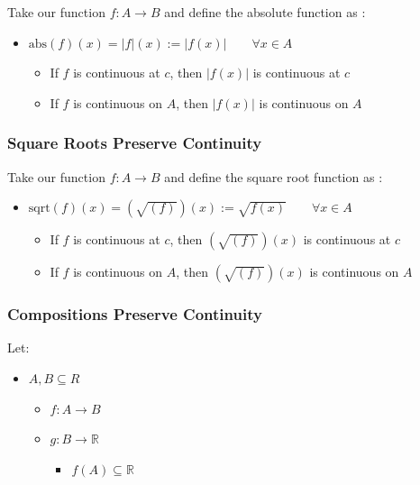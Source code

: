 \documentclass[class=article, crop=false]{standalone}
\begin{document}
Take our function \(f: A \rightarrow B\) and define the absolute
function as :

\begin{itemize}
\item
  \(\text{abs}(f)(x) = \left| f \right|(x) := \left| f(x) \right| \qquad\forall x \in A\)

  \begin{itemize}
  \item
    If \(f\) is continuous at \(c\), then \(\left| f(x) \right|\) is
    continuous at \(c\) 
  \item
    If \(f\) is continuous on \(A\), then \(\left| f(x) \right|\) is
    continuous on \(A\) 
  \end{itemize}
\end{itemize}

\hypertarget{header-n3954}{%
\subsubsection{Square Roots Preserve Continuity}\label{header-n3954}}

Take our function \(f: A \rightarrow B\) and define the square root
function as :

\begin{itemize}
\item
  \(\text{sqrt}(f)(x) = \left(\sqrt{(f)}\right) \left(x\right) := \sqrt{f(x)} \qquad\forall x \in A\)

  \begin{itemize}
  \item
    If \(f\) is continuous at \(c\), then
    \( \left(\sqrt{(f)}\right) \left(x\right)\) is continuous at \(c\) 
  \item
    If \(f\) is continuous on \(A\), then
    \( \left(\sqrt{(f)}\right) \left(x\right)\) is continuous on \(A\) 
  \end{itemize}
\end{itemize}

\hypertarget{header-n3964}{%
\subsubsection{Compositions Preserve Continuity}\label{header-n3964}}

Let:

\begin{itemize}
\item
  \(A, B \subseteq R\)

  \begin{itemize}
  \item
    \(f: A \rightarrow B\) 
  \item
    \(g: B\rightarrow \mathbb{R}\)

    \begin{itemize}
    \item
      \(f(A) \subseteq \mathbb{R}\) 
    \end{itemize}
  \end{itemize}
\end{itemize}
\end{document}
